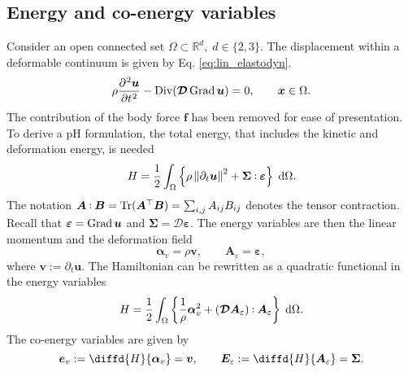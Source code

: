 \subsection{Energy and co-energy variables}
Consider an open connected set $\Omega \subset \mathbb{R}^d, \; d \in \{2,3\}$. The displacement within a deformable continuum is given by Eq. \eqref{eq:lin_elastodyn}. 
\begin{equation}
\rho \diffp[2]{\bm{u}}{t} - \Div(\bm{\mathcal{D}} \Grad \bm{u}) =0, \qquad \bm{x} \in \Omega.
\end{equation}
The contribution of the body force $\bm{f}$ has been removed for ease of presentation. To derive a pH formulation, the total energy, that includes the kinetic and  deformation energy, is needed
\begin{equation}
	H = \energy{\rho \norm{\partial_t \bm{u}}^2 + \bm{\Sigma} \cddot \bm{\varepsilon}}.
\end{equation}
The notation $\bm{A}\cddot \bm{B} = \Tr(\bm{A}^\top\bm{B}) = \sum_{i, j} A_{ij} B_{ij}$ denotes the tensor contraction. Recall that $\bm{\varepsilon}= \operatorname*{Grad}{\bm{u}}$ and $\bm{\Sigma}=\bm{\mathcal{D}}\bm{\varepsilon}$. The energy variables are then the linear momentum and the deformation field
\begin{equation*}
\bm{\alpha}_v = \rho \bm{v}, \qquad \bm{A}_{\varepsilon} = \bm{\varepsilon},
\end{equation*}
where $\bm{v}:= \partial_t \bm{u}$. The Hamiltonian can be rewritten as a quadratic functional in the energy variables
\begin{equation}
H = \energy{\frac{1}{\rho} \bm{\alpha}_v^2 + (\bm{\mathcal{D}} \bm{A}_{\varepsilon}) \cddot  \bm{A}_{\varepsilon}}.
\end{equation}
The co-energy variables are given by
\begin{equation}
\bm{e}_v := \diffd{H}{\bm{\alpha}_v} = \bm{v}, \qquad \bm{E}_\varepsilon := \diffd{H}{\bm{A}_{\varepsilon}} = \bm{\Sigma}.
\end{equation}  

